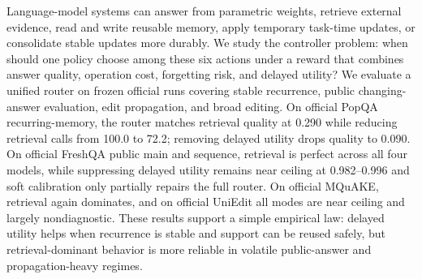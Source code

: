 Language-model systems can answer from parametric weights, retrieve external evidence, read and write reusable memory, apply temporary task-time updates, or consolidate stable updates more durably. We study the controller problem: when should one policy choose among these six actions under a reward that combines answer quality, operation cost, forgetting risk, and delayed utility? We evaluate a unified router on frozen official runs covering stable recurrence, public changing-answer evaluation, edit propagation, and broad editing. On official PopQA recurring-memory, the router matches retrieval quality at 0.290 while reducing retrieval calls from 100.0 to 72.2; removing delayed utility drops quality to 0.090. On official FreshQA public main and sequence, retrieval is perfect across all four models, while suppressing delayed utility remains near ceiling at 0.982--0.996 and soft calibration only partially repairs the full router. On official MQuAKE, retrieval again dominates, and on official UniEdit all modes are near ceiling and largely nondiagnostic. These results support a simple empirical law: delayed utility helps when recurrence is stable and support can be reused safely, but retrieval-dominant behavior is more reliable in volatile public-answer and propagation-heavy regimes.
